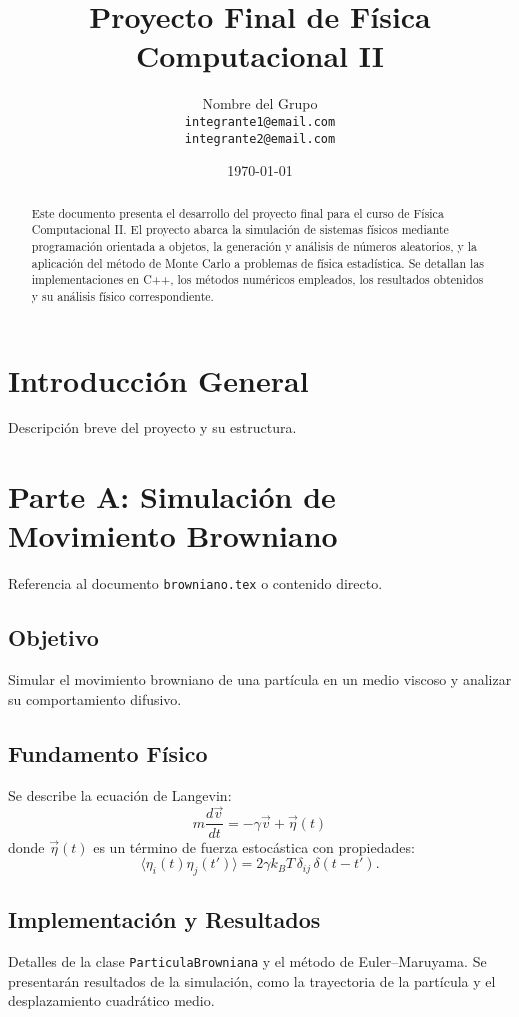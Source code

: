 \documentclass[11pt,a4paper]{article}
\title{\textbf{Proyecto Final de Física Computacional II}}
\author{Nombre del Grupo \\ \texttt{integrante1@email.com} \\ \texttt{integrante2@email.com}}
\date{\today}
\begin{document}
\maketitle
\begin{abstract}
Este documento presenta el desarrollo del proyecto final para el curso de Física Computacional II. El proyecto abarca la simulación de sistemas físicos mediante programación orientada a objetos, la generación y análisis de números aleatorios, y la aplicación del método de Monte Carlo a problemas de física estadística. Se detallan las implementaciones en C++, los métodos numéricos empleados, los resultados obtenidos y su análisis físico correspondiente.
\end{abstract}

\tableofcontents
\newpage

% 
% 
% 

\section{Introducción General}
Descripción breve del proyecto y su estructura.

\section{Parte A: Simulación de Movimiento Browniano}
\label{sec:parte_a}
Referencia al documento \texttt{browniano.tex} o contenido directo.
\subsection{Objetivo}
Simular el movimiento browniano de una partícula en un medio viscoso y analizar su comportamiento difusivo.
\subsection{Fundamento Físico}
Se describe la ecuación de Langevin:
\[ m\frac{d\vec v}{dt}= -\gamma\vec v + \vec\eta(t) \]
donde $\vec\eta(t)$ es un término de fuerza estocástica con propiedades:
\[ \langle\eta_i(t)\eta_j(t')\rangle=2\gamma k_B T\,\delta_{ij}\,\delta(t-t'). \]
\subsection{Implementación y Resultados}
Detalles de la clase \texttt{ParticulaBrowniana} y el método de Euler–Maruyama. Se presentarán resultados de la simulación, como la trayectoria de la partícula y el desplazamiento cuadrático medio.
\end{document}
